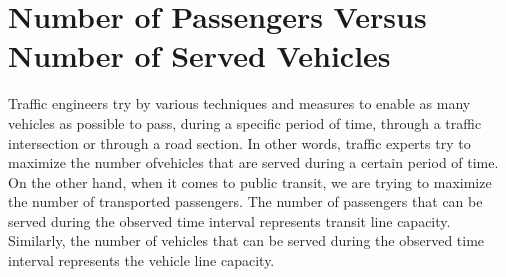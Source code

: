 %
\section{Number of Passengers Versus Number of Served Vehicles}
Traffic engineers try by various techniques and measures to enable as many vehicles as possible to pass,
during a specific period of time, through a traffic intersection or through a road section. In other words, traffic experts try to maximize the number ofvehicles that are served during a certain period of time. On the other hand, when it comes to public transit, we are trying to maximize the number of transported passengers. The number of passengers that can be served during the observed time interval represents transit line capacity. Similarly, the number of vehicles that can be served during the observed time interval represents the vehicle line capacity.
